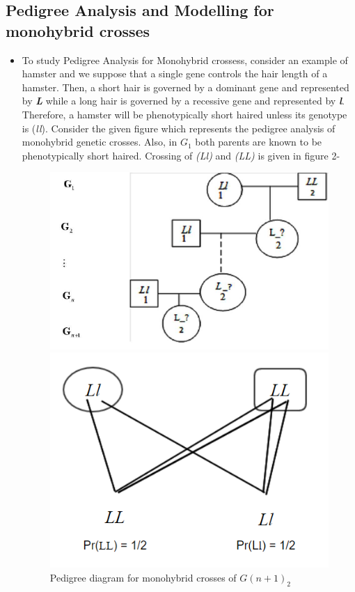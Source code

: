 \documentclass{article}
\begin{document}
\subsection{Pedigree Analysis and Modelling for monohybrid crosses}
\begin{itemize}
	\item To study Pedigree Analysis for Monohybrid crossess, consider an example of hamster and we suppose that a single gene controls the hair length of a hamster. Then, a short hair is governed by a dominant gene and represented by \textbf{\textit{L}} while a long hair is governed by a recessive gene and represented by \textbf{\textit{l}}. Therefore, a hamster will be phenotypically short haired unless its genotype is (\textit{ll}). Consider the given figure which represents the pedigree analysis of monohybrid genetic crosses. Also, in  \textit{$ G_1 $} both parents are known to be phenotypically short haired. Crossing of \textit{(Ll)} and \textit{(LL)} is given in figure 2-\\
	\pagebreak
	 \begin{figure}[h]
		\centering
		\begin{minipage}[b]{0.32\textwidth}
            \includegraphics[width=1.2\textwidth]{monohybrid_pedigree}
			\caption{Pedigree diagram for monohybrid crosses of $ G(n+1)_2 $}
		\end{minipage}%
		\hspace{3cm}
		\begin{minipage}[b]{0.32\textwidth}
			\includegraphics[width=1\textwidth]{a1}

\end{minipage}
\end{figure}
\end{itemize}
\end{document}
